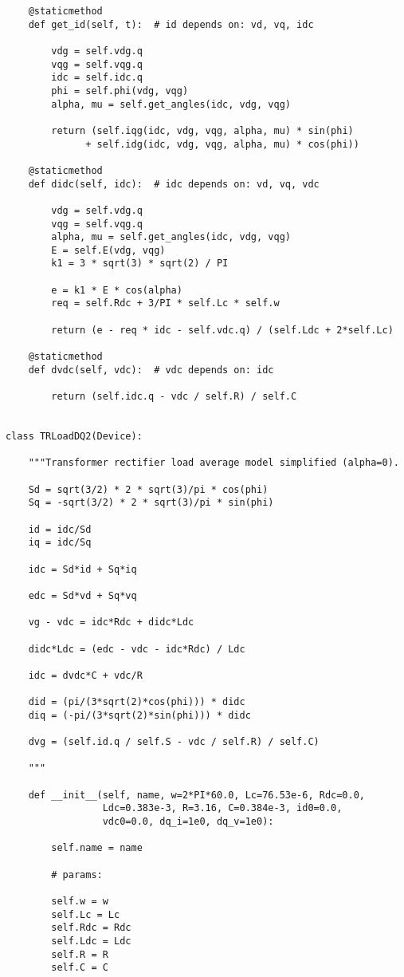 \begin{lstlisting}
    @staticmethod
    def get_id(self, t):  # id depends on: vd, vq, idc

        vdg = self.vdg.q
        vqg = self.vqg.q
        idc = self.idc.q
        phi = self.phi(vdg, vqg)
        alpha, mu = self.get_angles(idc, vdg, vqg)

        return (self.iqg(idc, vdg, vqg, alpha, mu) * sin(phi)
              + self.idg(idc, vdg, vqg, alpha, mu) * cos(phi))

    @staticmethod
    def didc(self, idc):  # idc depends on: vd, vq, vdc

        vdg = self.vdg.q
        vqg = self.vqg.q
        alpha, mu = self.get_angles(idc, vdg, vqg)
        E = self.E(vdg, vqg)
        k1 = 3 * sqrt(3) * sqrt(2) / PI

        e = k1 * E * cos(alpha)
        req = self.Rdc + 3/PI * self.Lc * self.w

        return (e - req * idc - self.vdc.q) / (self.Ldc + 2*self.Lc)

    @staticmethod
    def dvdc(self, vdc):  # vdc depends on: idc

        return (self.idc.q - vdc / self.R) / self.C


class TRLoadDQ2(Device):

    """Transformer rectifier load average model simplified (alpha=0).

    Sd = sqrt(3/2) * 2 * sqrt(3)/pi * cos(phi)
    Sq = -sqrt(3/2) * 2 * sqrt(3)/pi * sin(phi)

    id = idc/Sd
    iq = idc/Sq

    idc = Sd*id + Sq*iq

    edc = Sd*vd + Sq*vq

    vg - vdc = idc*Rdc + didc*Ldc

    didc*Ldc = (edc - vdc - idc*Rdc) / Ldc

    idc = dvdc*C + vdc/R

    did = (pi/(3*sqrt(2)*cos(phi))) * didc
    diq = (-pi/(3*sqrt(2)*sin(phi))) * didc

    dvg = (self.id.q / self.S - vdc / self.R) / self.C)

    """

    def __init__(self, name, w=2*PI*60.0, Lc=76.53e-6, Rdc=0.0,
                 Ldc=0.383e-3, R=3.16, C=0.384e-3, id0=0.0,
                 vdc0=0.0, dq_i=1e0, dq_v=1e0):

        self.name = name

        # params:

        self.w = w
        self.Lc = Lc
        self.Rdc = Rdc
        self.Ldc = Ldc
        self.R = R
        self.C = C


\end{lstlisting}
